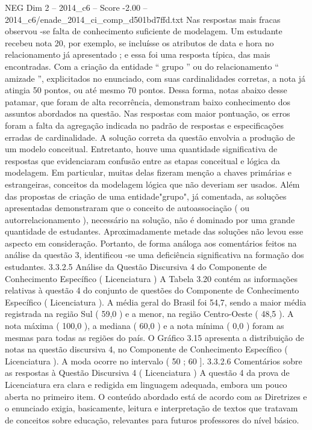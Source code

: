\begin{textsample}{NEG Dim 2 – 2014\_c6 – Score -2.00 – 2014\_c6/enade\_2014\_ci\_comp\_d501bd7ffd.txt}
Nas respostas mais fracas observou -se falta de conhecimento suficiente de modelagem.
Um estudante recebeu nota 20, por exemplo, se incluísse os atributos de data e hora no relacionamento já apresentado ; e essa foi uma resposta típica, das mais encontradas.
Com a criação da entidade “ grupo ” ou do relacionamento “ amizade ”, explicitados no enunciado, com suas cardinalidades corretas, a nota já atingia 50 pontos, ou até mesmo 70 pontos.
Dessa forma, notas abaixo desse patamar, que foram de alta recorrência, demonstram baixo conhecimento dos assuntos abordados na questão.
Nas respostas com maior pontuação, os erros foram a falta da agregação indicada no padrão de respostas e especificações erradas de cardinalidade.
A solução correta da questão envolvia a produção de um modelo conceitual.
Entretanto, houve uma quantidade significativa de respostas que evidenciaram confusão entre as etapas conceitual e lógica da modelagem.
Em particular, muitas delas fizeram menção a chaves primárias e estrangeiras, conceitos da modelagem lógica que não deveriam ser usados.
Além das propostas de criação de uma entidade"grupo", já comentada, as soluções apresentadas demonstraram que o conceito de autoassociação ( ou autorrelacionamento ), necessário na solução, não é dominado por uma grande quantidade de estudantes.
Aproximadamente metade das soluções não levou esse aspecto em consideração.
Portanto, de forma análoga aos comentários feitos na análise da questão 3, identificou -se uma deficiência significativa na formação dos estudantes. 3.3.2.5 Análise da Questão Discursiva 4 do Componente de Conhecimento Específico ( Licenciatura ) A Tabela 3.20 contém as informações relativas à questão 4 do conjunto de questões do Componente de Conhecimento Específico ( Licenciatura ).
A média geral do Brasil foi 54,7, sendo a maior média registrada na região Sul ( 59,0 ) e a menor, na região Centro-Oeste ( 48,5 ).
A nota máxima ( 100,0 ), a mediana ( 60,0 ) e a nota mínima ( 0,0 ) foram as mesmas para todas as regiões do país.
O Gráfico 3.15 apresenta a distribuição de notas na questão discursiva 4, no Componente de Conhecimento Específico ( Licenciatura ).
A moda ocorre no intervalo ( 50 ; 60 ]. 3.3.2.6 Comentários sobre as respostas à Questão Discursiva 4 ( Licenciatura ) A questão 4 da prova de Licenciatura era clara e redigida em linguagem adequada, embora um pouco aberta no primeiro item.
O conteúdo abordado está de acordo com as Diretrizes e o enunciado exigia, basicamente, leitura e interpretação de textos que tratavam de conceitos sobre educação, relevantes para futuros professores do nível básico.

\end{textsample}
